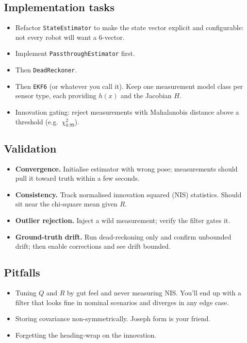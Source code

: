 \documentclass[11pt,a4paper]{article}
\newcommand{\code}[1]{\texttt{\small #1}}
\begin{document}
\subsection*{Implementation tasks}

\begin{itemize}
    \item Refactor \code{StateEstimator} to make the state vector
        explicit and configurable: not every robot will want a 6-vector.
    \item Implement \code{PassthroughEstimator} first.
    \item Then \code{DeadReckoner}.
    \item Then \code{EKF6} (or whatever you call it). Keep one
        measurement model class per sensor type, each providing $h(x)$ and
        the Jacobian $H$.
    \item Innovation gating: reject measurements with Mahalanobis distance
        above a threshold (e.g.\ $\chi^2_{0.99}$).
\end{itemize}

\subsection*{Validation}

\begin{itemize}
    \item \textbf{Convergence.} Initialise estimator with wrong pose;
        measurements should pull it toward truth within a few seconds.
    \item \textbf{Consistency.} Track normalised innovation squared (NIS)
        statistics. Should sit near the chi-square mean given $R$.
    \item \textbf{Outlier rejection.} Inject a wild measurement; verify
        the filter gates it.
    \item \textbf{Ground-truth drift.} Run dead-reckoning only and confirm
        unbounded drift; then enable corrections and see drift bounded.
\end{itemize}

\subsection*{Pitfalls}

\begin{itemize}
    \item Tuning $Q$ and $R$ by gut feel and never measuring NIS. You'll
        end up with a filter that looks fine in nominal scenarios and
        diverges in any edge case.
    \item Storing covariance non-symmetrically. Joseph form is your
        friend.
    \item Forgetting the heading-wrap on the innovation.
\end{itemize}
\end{document}
